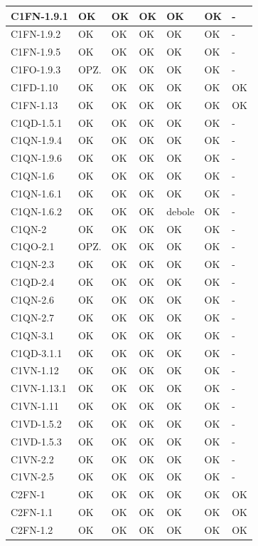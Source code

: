\begin{longtable}{|p{}|p{2cm}|p{2cm}|p{2cm}|p{2cm}|p{}|p{2cm}|}
 C1FN-1.9.1&  OK&  OK&  OK&  OK&  OK& -\\ \hline
 C1FN-1.9.2&  OK&  OK&  OK&  OK&  OK& -\\ \hline
 C1FN-1.9.5&  OK&  OK&  OK&  OK&  OK& -\\ \hline
 C1FO-1.9.3&  OPZ.&  OK&  OK&  OK&  OK& -\\ \hline
 C1FD-1.10&  OK&  OK&  OK&  OK&  OK& OK\\ \hline
 C1FN-1.13&  OK&  OK&  OK&  OK&  OK& OK\\ \hline
 C1QD-1.5.1&  OK&  OK&  OK&  OK&  OK& -\\ \hline
 C1QN-1.9.4&  OK&  OK&  OK&  OK&  OK& -\\ \hline
 C1QN-1.9.6&  OK&  OK&  OK&  OK&  OK& -\\ \hline
 C1QN-1.6&  OK&  OK&  OK&  OK&  OK& -\\ \hline
 C1QN-1.6.1&  OK&  OK&  OK&  OK&  OK& -\\ \hline
 C1QN-1.6.2&  OK&  OK&  OK&  debole&  OK& -\\ \hline
 C1QN-2&  OK&  OK&  OK&  OK&  OK& -\\ \hline
 C1QO-2.1&  OPZ.&  OK&  OK&  OK&  OK& -\\ \hline
 C1QN-2.3&  OK&  OK&  OK&  OK&  OK& -\\ \hline
 C1QD-2.4&  OK&  OK&  OK&  OK&  OK& -\\ \hline
 C1QN-2.6&  OK&  OK&  OK&  OK&  OK& -\\ \hline
 C1QN-2.7&  OK&  OK&  OK&  OK&  OK& -\\ \hline
 C1QN-3.1&  OK&  OK&  OK&  OK&  OK& -\\ \hline
 C1QD-3.1.1&  OK&  OK&  OK&  OK&  OK& -\\ \hline
 C1VN-1.12&  OK&  OK&  OK&  OK&  OK& -\\ \hline
 C1VN-1.13.1&  OK&  OK&  OK&  OK&  OK& -\\ \hline
 C1VN-1.11&  OK&  OK&  OK&  OK&  OK& -\\ \hline
 C1VD-1.5.2&  OK&  OK&  OK&  OK&  OK& -\\ \hline
 C1VD-1.5.3&  OK&  OK&  OK&  OK&  OK& -\\ \hline
 C1VN-2.2&  OK&  OK&  OK&  OK&  OK& -\\ \hline
 C1VN-2.5&  OK&  OK&  OK&  OK&  OK& -\\ \hline
 C2FN-1&  OK&  OK&  OK&  OK&  OK& OK\\ \hline
 C2FN-1.1&  OK&  OK&  OK&  OK&  OK& OK\\ \hline
 C2FN-1.2&  OK&  OK&  OK&  OK&  OK& OK\\ \hline

\end{longtable}
